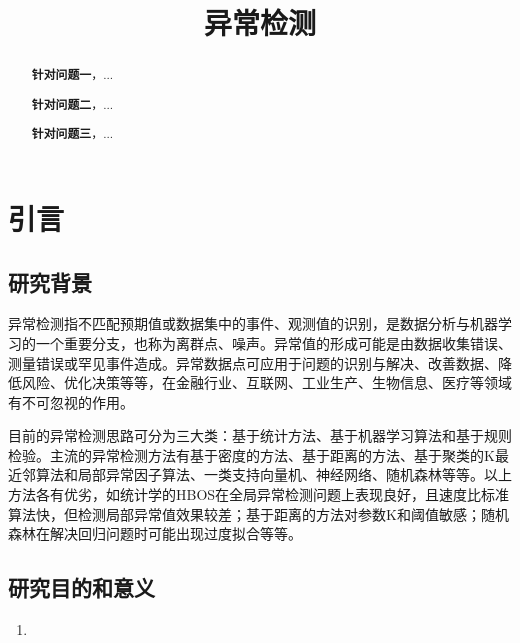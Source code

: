 \documentclass[a4paper]{article}
\title{异常检测}
\date{} %
\begin{document}
	\maketitle
	\vspace{0em} %
	\begin{abstract}
		
		\textbf{针对问题一}，...
		
		\textbf{针对问题二}，...
		
		\textbf{针对问题三}，...
		\\
		\newline
	\end{abstract}
	
	\clearpage %
	
	\section{引言}
	\subsection{研究背景}
	异常检测指不匹配预期值或数据集中的事件、观测值的识别，是数据分析与机器学习的一个重要分支，也称为离群点、噪声。异常值的形成可能是由数据收集错误、测量错误或罕见事件造成。异常数据点可应用于问题的识别与解决、改善数据、降低风险、优化决策等等，在金融行业、互联网、工业生产、生物信息、医疗等领域有不可忽视的作用。
	
	目前的异常检测思路可分为三大类：基于统计方法、基于机器学习算法和基于规则检验。主流的异常检测方法有基于密度的方法、基于距离的方法、基于聚类的K最近邻算法和局部异常因子算法、一类支持向量机、神经网络、随机森林等等。以上方法各有优劣，如统计学的HBOS在全局异常检测问题上表现良好，且速度比标准算法快，但检测局部异常值效果较差；基于距离的方法对参数K和阈值敏感；随机森林在解决回归问题时可能出现过度拟合等等。
	
	
	\subsection{研究目的和意义}
	\begin{enumerate}[itemindent=0cm,leftmargin=0em,label=(\roman*)]
		\item 
		
	\end{enumerate}
\end{document}
